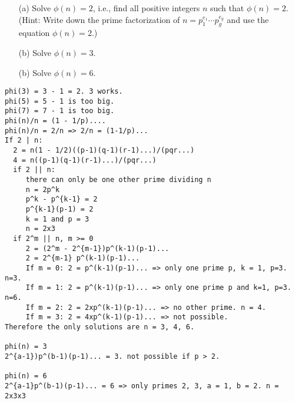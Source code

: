   \mbox{}
  \begin{enumerate}[nosep]
    \item[(a)]
      Solve $\phi(n) = 2$, i.e., find all positive integers $n$ such that
      $\phi(n) = 2$.
      (Hint: Write down the prime factorization of
      $n = p_1^{e_1}\cdots p_g^{e_g}$ and use the
      equation $\phi(n) = 2$.)
    \item[(b)] Solve $\phi(n) = 3$.
    \item[(b)] Solve $\phi(n) = 6$.
  \end{enumerate}
\BEGINCOMMENT
\begin{Verbatim}
phi(3) = 3 - 1 = 2. 3 works.
phi(5) = 5 - 1 is too big.
phi(7) = 7 - 1 is too big.
phi(n)/n = (1 - 1/p)....
phi(n)/n = 2/n => 2/n = (1-1/p)...
If 2 | n:
  2 = n(1 - 1/2)((p-1)(q-1)(r-1)...)/(pqr...)
  4 = n((p-1)(q-1)(r-1)...)/(pqr...)
  if 2 || n:
     there can only be one other prime dividing n
     n = 2p^k
     p^k - p^{k-1} = 2
     p^{k-1}(p-1) = 2
     k = 1 and p = 3
     n = 2x3
  if 2^m || n, m >= 0
     2 = (2^m - 2^{m-1})p^(k-1)(p-1)...
     2 = 2^{m-1} p^(k-1)(p-1)...
     If m = 0: 2 = p^(k-1)(p-1)... => only one prime p, k = 1, p=3. n=3.
     If m = 1: 2 = p^(k-1)(p-1)... => only one prime p and k=1, p=3. n=6.
     If m = 2: 2 = 2xp^(k-1)(p-1)... => no other prime. n = 4.
     If m = 3: 2 = 4xp^(k-1)(p-1)... => not possible.
Therefore the only solutions are n = 3, 4, 6.

phi(n) = 3 
2^{a-1})p^(b-1)(p-1)... = 3. not possible if p > 2.

phi(n) = 6
2^{a-1}p^(b-1)(p-1)... = 6 => only primes 2, 3, a = 1, b = 2. n = 2x3x3
\end{Verbatim}
\ENDCOMMENT
